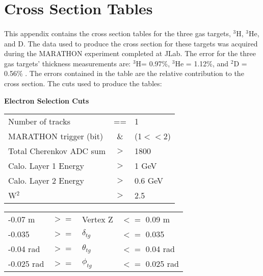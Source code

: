 

\section{Cross Section Tables}\label{CST}
\paragraph{}This appendix contains the cross section tables for the three gas targets, $^3$H, $^3$He, and D. The data used to produce the cross section for these targets was acquired during the MARATHON experiment completed at JLab. The error for the three gas targets' thickness measurements are: $^3$H= 0.97\%, $^3$He = 1.12\%, and $^2$D = 0.56\% \cite{HATT_eng}. The errors contained in the table are the relative contribution to the cross section. The cuts used to produce the tables:

\textbf{Electron Selection Cuts}\\

\begin{tabular}{@{$\bullet$ }lcl}
	Number of tracks &==& 1\\
	MARATHON trigger (bit)  &\& &(1$<<$2)\\
	Total Cherenkov ADC sum &$>$ &1800\\
	Calo. Layer 1 Energy &$>$ & 1 GeV\\
	Calo. Layer 2 Energy &$>$ & 0.6 GeV\\
	W$^2$ &$>$ &2.5
\end{tabular}

\begin{tabular}{@{$\bullet$ }lcll}
	-0.07 m &$>=$& Vertex Z &$<=$ 0.09 m\\
	-0.035 &$ >=$ &$\delta_{tg}$ &$<=$ 0.035\\
	-0.04 rad &$>=$  &$\theta_{tg}$ &$<=$ 0.04 rad\\
	-0.025 rad &$>=$  &$\phi_{tg}$  &$<=$ 0.025 rad\\
\end{tabular}

